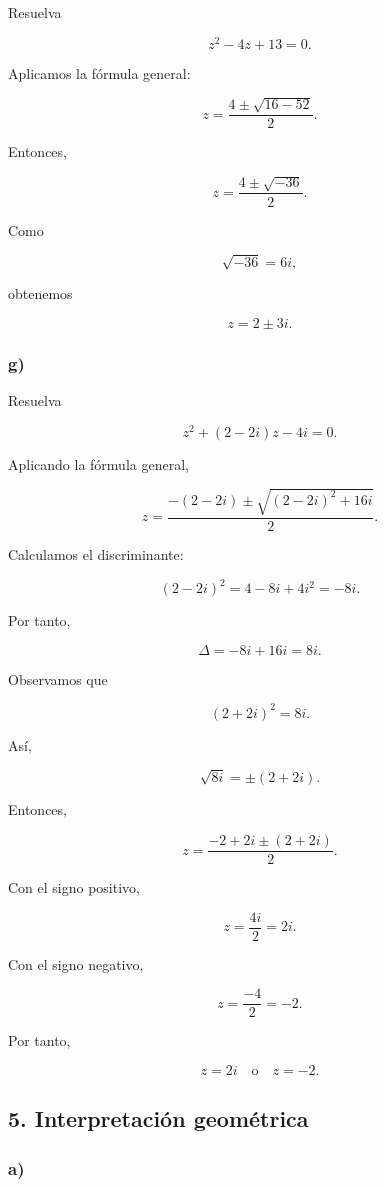 \documentclass[12pt]{article}
\begin{document}
Resuelva

\[
z^2-4z+13=0.
\]

Aplicamos la fórmula general:

\[
z
=
\frac{4\pm\sqrt{16-52}}{2}.
\]

Entonces,

\[
z
=
\frac{4\pm\sqrt{-36}}{2}.
\]

Como

\[
\sqrt{-36}=6i,
\]

obtenemos

\[
\boxed{
z=2\pm3i
}.
\]

\subsubsection*{g)}

Resuelva

\[
z^2+(2-2i)z-4i=0.
\]

Aplicando la fórmula general,

\[
z
=
\frac{-(2-2i)
\pm
\sqrt{(2-2i)^2+16i}}{2}.
\]

Calculamos el discriminante:

\[
(2-2i)^2
=
4-8i+4i^2
=
-8i.
\]

Por tanto,

\[
\Delta=-8i+16i=8i.
\]

Observamos que

\[
(2+2i)^2=8i.
\]

Así,

\[
\sqrt{8i}=\pm(2+2i).
\]

Entonces,

\[
z
=
\frac{-2+2i\pm(2+2i)}{2}.
\]

Con el signo positivo,

\[
z
=
\frac{4i}{2}
=
2i.
\]

Con el signo negativo,

\[
z
=
\frac{-4}{2}
=
-2.
\]

Por tanto,

\[
\boxed{
z=2i
\quad\text{o}\quad
z=-2
}.
\]

\subsection*{5. Interpretación geométrica}

\subsubsection*{a)}
\end{document}
